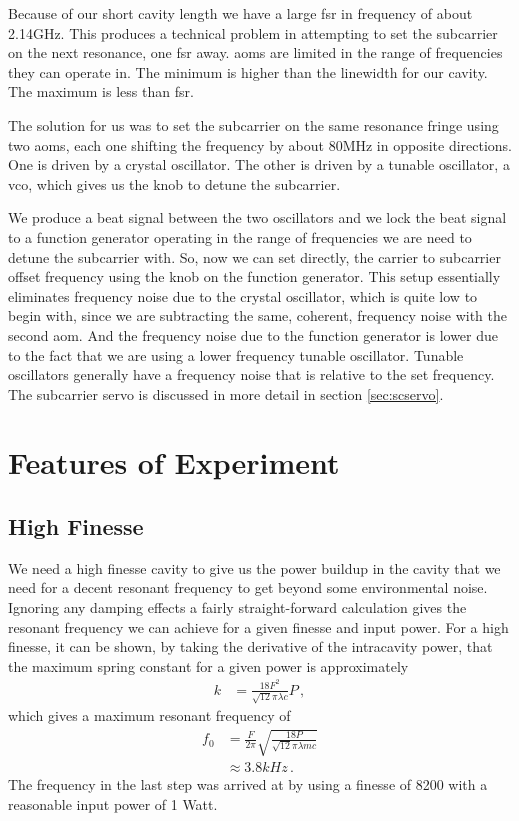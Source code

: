 Because of our short cavity length we have a large \ac{fsr} in frequency of
about 2.14GHz.
This produces a technical problem in attempting to set the
subcarrier on the next resonance, one \ac{fsr} away.
\ac{aom}s are limited in the range of frequencies they can operate in.
The minimum is higher than the linewidth for our cavity.
The maximum is less than \ac{fsr}.

The solution for us was to set the subcarrier on the same resonance fringe
using two \ac{aom}s, each one shifting the frequency by about 80MHz in
opposite directions.
One is driven by a crystal oscillator.
The other is driven by a tunable oscillator, a \ac{vco}, which gives us the
knob to detune the subcarrier.

We produce a beat signal between the two oscillators and we lock the beat
signal to a function generator operating in the range of frequencies we are
need to detune the subcarrier with. So, now we can set directly, the carrier
to subcarrier offset frequency using the knob on the function generator.
This setup essentially eliminates frequency noise due to the crystal
oscillator, which is quite low to begin with, since we are subtracting the
same, coherent, frequency noise with the second \ac{aom}.
And the frequency noise due to the function generator is lower due to the
fact that we are using a lower frequency tunable oscillator.
Tunable oscillators generally have a frequency noise that is relative to the
set frequency. The subcarrier servo is discussed in more detail in section
\ref{sec:scservo}.

\section{Features of Experiment}
\subsection{High Finesse}
We need a high finesse cavity to give us the power buildup in the cavity that
we need for a decent resonant frequency to get beyond some environmental noise.
Ignoring any damping effects a fairly straight-forward calculation gives the
resonant frequency we can achieve for a given finesse and input power. For a
high finesse, it can be shown, by taking the derivative of the intracavity power,
that the maximum spring constant for a given power is approximately
\begin{align}
k &= \frac{18 F^2}{\sqrt{12} \pi \lambda c} P \,,
\end{align}
which gives a maximum resonant frequency of
\begin{align}
f_0 &= \frac{F}{2 \pi} \sqrt{\frac{18 P}{\sqrt{12} \pi \lambda m c }} \\
&\approx 3.8kHz \,.
\end{align}
The frequency in the last step was arrived at by using a finesse of 8200
with a reasonable input power of 1 Watt.

